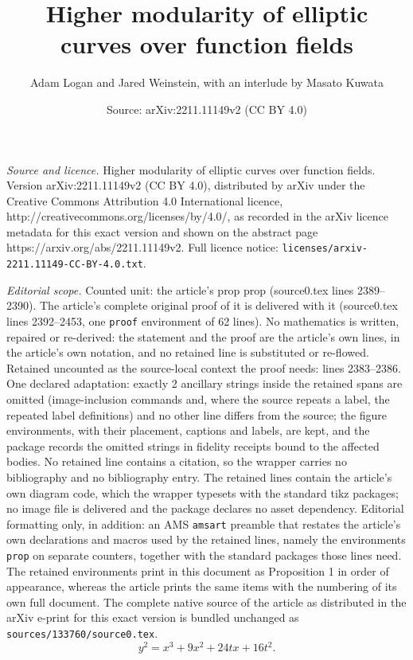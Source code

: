 \documentclass[10pt,a4paper]{amsart}
\title{Higher modularity of elliptic curves over function fields}
\author{Adam Logan and Jared Weinstein, with an interlude by Masato Kuwata}
\date{Source: arXiv:2211.11149v2 (CC BY 4.0)}
\begin{document}
\maketitle

\noindent\emph{Source and licence.} Higher modularity of elliptic curves over function fields. Version arXiv:2211.11149v2 (CC BY 4.0), distributed by arXiv under the Creative Commons Attribution 4.0 International licence, http://creativecommons.org/licenses/by/4.0/, as recorded in the arXiv licence metadata for this exact version and shown on the abstract page https://arxiv.org/abs/2211.11149v2. Full licence notice: \texttt{licenses/arxiv-2211.11149-CC-BY-4.0.txt}.\par\smallskip

\noindent\textit{Editorial scope.} Counted unit: the article's prop prop (source0.tex lines 2389--2390). The article's complete original proof of it is delivered with it (source0.tex lines 2392--2453, one \texttt{proof} environment of 62 lines). No mathematics is written, repaired or re-derived: the statement and the proof are the article's own lines, in the article's own notation, and no retained line is substituted or re-flowed.  Retained uncounted as the source-local context the proof needs: lines 2383--2386.  One declared adaptation: exactly 2 ancillary strings inside the retained spans are omitted (image-inclusion commands and, where the source repeats a label, the repeated label definitions) and no other line differs from the source; the figure environments, with their placement, captions and labels, are kept, and the package records the omitted strings in fidelity receipts bound to the affected bodies.  No retained line contains a citation, so the wrapper carries no bibliography and no bibliography entry.  The retained lines contain the article's own diagram code, which the wrapper typesets with the standard tikz packages; no image file is delivered and the package declares no asset dependency.  Editorial formatting only, in addition: an AMS \texttt{amsart} preamble that restates the article's own declarations and macros used by the retained lines, namely the environments \texttt{prop} on separate counters, together with the standard packages those lines need.  The retained environments print in this document as Proposition 1 in order of appearance, whereas the article prints the same items with the numbering of its own full document.  The complete native source of the article as distributed in the arXiv e-print for this exact version is bundled unchanged as \texttt{sources/133760/source0.tex}.
\begin{equation}
\label{EqEIV}
 y^2 = x^3 + 9 x^2 + 24 t x + 16 t^2. 
 \end{equation}
\end{document}
